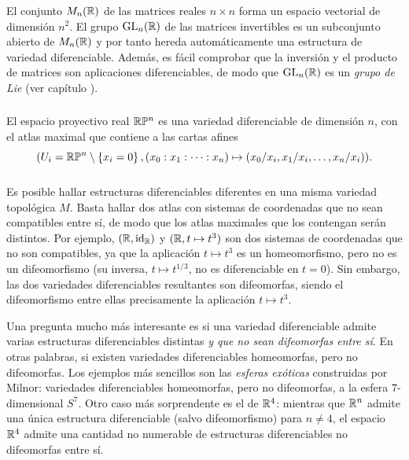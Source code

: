 \documentclass[11pt,a4paper]{amsbook}
\theoremstyle{remark} \newtheorem{rmk}[subsection]{Observación}
\theoremstyle{definition} \newtheorem{defn}[subsection]{Definición}
\theoremstyle{definition} \newtheorem{ex}[subsection]{Ejemplo}
\theoremstyle{definition} \newtheorem{ej}[subsection]{Ejercicio}
\begin{document}
\subsubsection{} El conjunto $M_n(\mathbb R)$ de las matrices reales $n\times n$ forma un espacio vectorial de dimensión $n^2$. El grupo $\operatorname{GL}_n(\mathbb R)$ de las matrices invertibles es un subconjunto abierto de $M_n(\mathbb R)$ y por tanto hereda automáticamente una estructura de variedad diferenciable. Además, es fácil comprobar que la inversión y el producto de matrices son aplicaciones diferenciables, de modo que $\operatorname{GL}_n(\mathbb R)$ es un \emph{grupo de Lie} (ver capítulo ).

\subsubsection{} El espacio proyectivo real $\mathbb R \mathbb P^n$ es una variedad diferenciable de dimensión $n$, con el atlas maximal que contiene a las cartas afines
\begin{equation*}
(U_i = \mathbb R \mathbb P^n \setminus \left\{ x_i=0 \right\}, (x_0:x_1:\dots:x_n) \mapsto (x_0/x_i, x_1/x_i,\dots,x_n/x_i)).
\end{equation*}

\subsubsection{} Es posible hallar estructuras diferenciables diferentes en una misma variedad topológica $M$. Basta hallar dos atlas con sistemas de coordenadas que no sean compatibles entre sí, de modo que los atlas maximales que los contengan serán distintos. Por ejemplo, $(\mathbb R,\mathrm{id}_\mathbb R)$ y $(\mathbb R, t \mapsto t^3)$ son dos sistemas de coordenadas que no son compatibles, ya que la aplicación $t\mapsto t^3$ es un homeomorfismo, pero no es un difeomorfismo (su inversa, $t\mapsto t^{1/3}$, no es diferenciable en $t=0$). Sin embargo, las dos variedades diferenciables resultantes son difeomorfas, siendo el difeomorfismo entre ellas precisamente la aplicación $t\mapsto t^3$.

Una pregunta mucho más interesante es si una variedad diferenciable admite varias estructuras diferenciables distintas \textit{y que no sean difeomorfas entre sí}. En otras palabras, si existen variedades diferenciables homeomorfas, pero no difeomorfas. Los ejemplos más sencillos son las \emph{esferas exóticas} construidas por Milnor: variedades diferenciables homeomorfas, pero no difeomorfas, a la esfera $7$-dimensional $S^7$. Otro caso más sorprendente es el de $\mathbb R^4$: mientras que $\mathbb R^n$ admite una única estructura diferenciable (salvo difeomorfismo) para $n\neq 4$, el espacio $\mathbb R^4$ admite una cantidad no numerable de estructuras diferenciables no difeomorfas entre sí.
\end{document}
